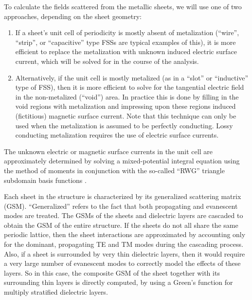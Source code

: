 \documentclass[
letterpaper, %
11pt, %
oneside, 
onecolumn, %
openany, %
]{memoir}
\numberwithin{equation}{chapter}
\numberwithin{figure}{chapter}
\begin{document}
To calculate the fields scattered from the metallic sheets, we will
use one of two approaches, depending on the sheet geometry:
\begin{enumerate}
\item If a sheet's unit cell of periodicity is mostly absent of
  metalization (``wire'', ``strip'', or ``capacitive'' type FSSs are
  typical examples of this), 
  it is more efficient to replace the metalization
  with unknown induced electric surface current, which will be
  solved for in the course of the analysis.
\item Alternatively, if the unit cell is mostly metalized (as in a
  ``slot'' or ``inductive'' type of FSS), then it is
  more efficient to solve for the tangential electric field in the
  non-metalized (``void'') area.  In practice this is done by filling
  in the void regions 
  with metalization and impressing upon these regions induced
  (fictitious) magnetic surface current.  Note that this technique can
  only be used when the metalization is assumed to be perfectly
  conducting.  Lossy conducting metalization requires the use of
  electric surface currents.
\end{enumerate}

The unknown electric or magnetic surface currents in the unit cell are
approximately determined by solving a mixed-potential integral
equation using
the method of moments in conjunction with the so-called ``RWG''
triangle subdomain basis functions \cite{rawg:82}. 

Each sheet in the structure is characterized by its generalized
scattering matrix (GSM).  ``Generalized'' refers to the fact that both
propagating and evanescent modes are treated.  The GSMs of the sheets
and dielectric layers are cascaded to obtain the GSM of the entire
structure. If the sheets do not all share the same periodic lattice,
then the sheet interactions are approximated by accounting only for
the dominant, propagating TE and TM modes during the cascading
process.  Also, if a sheet is surrounded by very thin dielectric
layers, then it would require a very large number of evanescent modes
to correctly model the effects of these layers.  So in this case, the
composite GSM of the sheet together with its surrounding thin layers
is directly computed, by
using a Green's function for multiply stratified dielectric layers.
\end{document}
